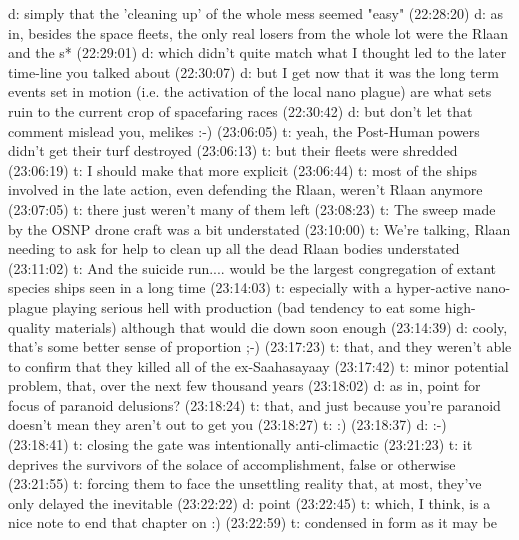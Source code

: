 d: simply that the 'cleaning up' of the whole mess seemed "easy"
(22:28:20) d: as in, besides the space fleets, the only real losers from the whole lot were the Rlaan and the s*
(22:29:01) d: which didn't quite match what I thought led to the later time-line you talked about
(22:30:07) d: but I get now that it was the long term events set in motion (i.e. the activation of the local nano plague) are what sets ruin to the current crop of spacefaring races 
(22:30:42) d: but don't let that comment mislead you, melikes :-)
(23:06:05) t: yeah, the Post-Human powers didn't get their turf destroyed
(23:06:13) t: but their fleets were shredded
(23:06:19) t: I should make that more explicit
(23:06:44) t: most of the ships involved in the late action, even defending the Rlaan, weren't Rlaan anymore 
(23:07:05) t: there just weren't many of them left
(23:08:23) t: The sweep made by the OSNP drone craft was a bit understated
(23:10:00) t: We're talking, Rlaan needing to ask for help to clean up all the dead Rlaan bodies understated
(23:11:02) t: And the suicide run.... would be the largest congregation of extant species ships seen in a long time
(23:14:03) t: especially with a hyper-active nano-plague playing serious hell with production (bad tendency to eat some high-quality materials) although that would die down soon enough 
(23:14:39) d: cooly, that's some better sense of proportion ;-)
(23:17:23) t: that, and they weren't able to confirm that they killed all of the ex-Saahasayaay
(23:17:42) t: minor potential problem, that, over the next few thousand years
(23:18:02) d: as in, point for focus of paranoid delusions?
(23:18:24) t: that, and just because you're paranoid doesn't mean they aren't out to get you
(23:18:27) t: :)
(23:18:37) d: :-)
(23:18:41) t: closing the gate was intentionally anti-climactic
(23:21:23) t: it deprives the survivors of the solace of accomplishment, false or otherwise
(23:21:55) t: forcing them to face the unsettling reality that, at most, they've only delayed the inevitable
(23:22:22) d: point
(23:22:45) t: which, I think, is a nice note to end that chapter on :)
(23:22:59) t: condensed in form as it may be

